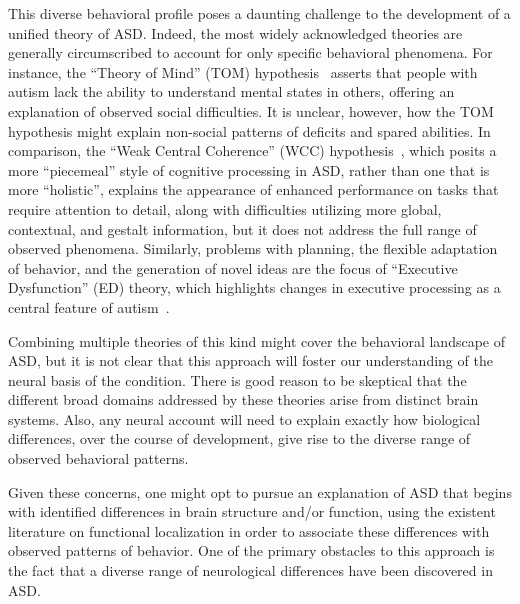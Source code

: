 This diverse behavioral profile poses a daunting challenge to the development of a unified theory of ASD. Indeed, the most widely acknowledged theories are generally circumscribed to account for only specific behavioral phenomena. For instance, the ``Theory of Mind'' (TOM) hypothesis~\cite{Baron-Cohen:1985:AutismTOM} asserts that people with autism lack the ability to understand mental states in others, offering an explanation of observed social difficulties. It is unclear, however, how the TOM hypothesis might explain non-social patterns of deficits and spared abilities. In comparison, the ``Weak Central Coherence'' (WCC) hypothesis~\cite{RefWorks:37}, which posits a more ``piecemeal'' style of cognitive processing in ASD, rather than one that is more ``holistic'', explains the appearance of enhanced performance on tasks that require attention to detail, along with difficulties utilizing more global, contextual, and gestalt information, but it does not address the full range of observed phenomena. Similarly, problems with planning, the flexible adaptation of behavior, and the generation of novel ideas are the focus of ``Executive Dysfunction'' (ED) theory, which highlights changes in executive processing as a central feature of autism~\cite{HughesC:1994:AutismExecutiveDysfunction,HillEL:2004:AutismExecutiveDysfunction,Ozonoff:1991:AutismExecutiveDysfunction}.  

Combining multiple theories of this kind might cover the behavioral landscape of ASD, but it is not clear that this approach will foster our understanding of the neural basis of the condition. There is good reason to be skeptical that the different broad domains addressed by these theories arise from distinct brain systems. Also, any neural account will need to explain exactly how biological differences, over the course of development, give rise to the diverse range of observed behavioral patterns.

Given these concerns, one might opt to pursue an explanation of ASD that begins with identified differences in brain structure and/or function, using the existent literature on functional localization in order to associate these differences with observed patterns of behavior. One of the primary obstacles to this approach is the fact that a diverse range of neurological differences have been discovered in ASD.


